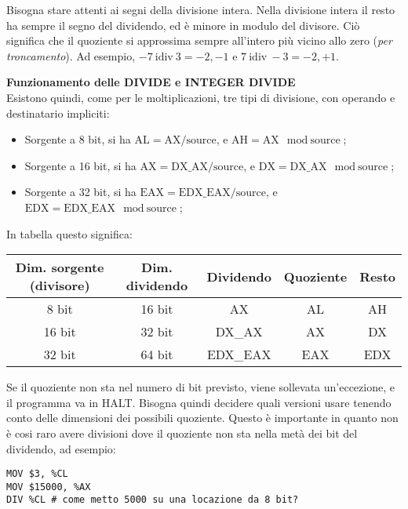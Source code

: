 \documentclass[a4paper,11pt]{article}
\begin{document}
Bisogna stare attenti ai segni della divisione intera.
Nella divisione intera il resto ha sempre il segno del dividendo, ed è minore in modulo del divisore.
Ciò significa che il quoziente si approssima sempre all'intero più vicino allo zero (\textit{per troncamento}).
Ad esempio, $-7 \ \mathrm{idiv} \ 3 = -2, -1$ e $7 \ \mathrm{idiv} \ -3 = -2, +1$.

\par\medskip
\noindent
\textbf{\textsf{Funzionamento delle DIVIDE e INTEGER DIVIDE}} \\
Esistono quindi, come per le moltiplicazioni, tre tipi di divisione, con operando e destinatario impliciti:
\begin{itemize}
	\item Sorgente a 8 bit, si ha $\text{AL} = \text{AX} / \text{source}$, e $ \text{AH} = \text{AX} \mod \text{source} $;
	\item Sorgente a 16 bit, si ha $\text{AX} = \text{DX\_AX} / \text{source}$, e $ \text{DX} = \text{DX\_AX} \mod \text{source} $;
	\item Sorgente a 32 bit, si ha $\text{EAX} = \text{EDX\_EAX} / \text{source}$, e $ \text{EDX} = \text{EDX\_EAX} \mod \text{source} $;
\end{itemize}

In tabella questo significa:

\begin{table}[h!]
	\center {}
	\begin{tabular} { c | c | c | c | c }
		\bfseries Dim. sorgente (divisore) & \bfseries Dim. dividendo & \bfseries Dividendo & \bfseries Quoziente & \bfseries Resto \\ 
		\hline 
		8 bit & 16 bit & AX & AL & AH \\ 
		16 bit & 32 bit & DX\_AX & AX & DX \\ 
		32 bit & 64 bit & EDX\_EAX & EAX & EDX
	\end{tabular}
\end{table}

Se il quoziente non sta nel numero di bit previsto, viene sollevata un'eccezione, e il programma va in HALT.
Bisogna quindi decidere quali versioni usare tenendo conto delle dimensioni dei possibili quoziente.
Questo è importante in quanto non è cosi raro avere divisioni dove il quoziente non sta nella metà dei bit del dividendo, ad esempio:

\begin{lstlisting}[style=codestyle]	
MOV $3, %CL
MOV $15000, %AX
DIV %CL	# come metto 5000 su una locazione da 8 bit?
\end{lstlisting}
\end{document}
